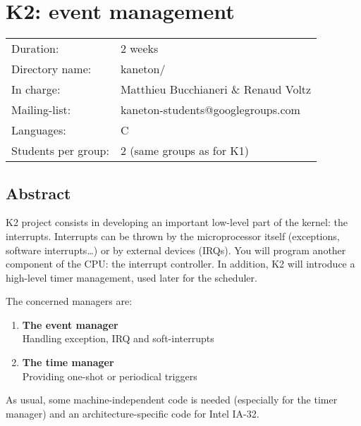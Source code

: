 
%
%

\chapter{K2: event management}

%
%

\begin{tabular}{p{7cm}l}
Duration: & 2 weeks \\
Directory name: & kaneton/ \\
In charge: & Matthieu Bucchianeri \& Renaud Voltz\\
Mailing-list: & kaneton-students@googlegroups.com \\
Languages: & C \\
Students per group: & 2 (same groups as for K1) \\
\end{tabular}

\section{Abstract}

K2 project consists in developing an important low-level part of the
kernel: the interrupts. Interrupts can be thrown by the microprocessor
itself (exceptions, software interrupts\ldots) or by external devices
(IRQs). You will program another component of the CPU: the interrupt
controller. In addition, K2 will introduce a high-level timer
management, used later for the scheduler.

The concerned managers are:

\begin{enumerate}
  \item
    {\bf The event manager}\\
    Handling exception, IRQ and soft-interrupts
  \item
    {\bf The time manager}\\
    Providing one-shot or periodical triggers
\end{enumerate}

As usual, some machine-independent code is needed (especially for the
timer manager) and an architecture-specific code for Intel IA-32.

